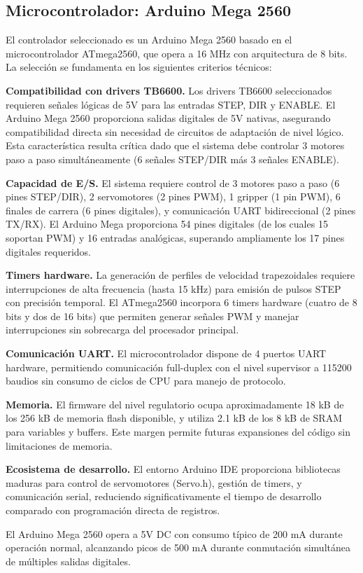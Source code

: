 \subsection{Microcontrolador: Arduino Mega 2560}

El controlador seleccionado es un Arduino Mega 2560 basado en el microcontrolador ATmega2560, que opera a 16 MHz con arquitectura de 8 bits. La selección se fundamenta en los siguientes criterios técnicos:

\textbf{Compatibilidad con drivers TB6600.} Los drivers TB6600 seleccionados requieren señales lógicas de 5V para las entradas STEP, DIR y ENABLE. El Arduino Mega 2560 proporciona salidas digitales de 5V nativas, asegurando compatibilidad directa sin necesidad de circuitos de adaptación de nivel lógico. Esta característica resulta crítica dado que el sistema debe controlar 3 motores paso a paso simultáneamente (6 señales STEP/DIR más 3 señales ENABLE).

\textbf{Capacidad de E/S.} El sistema requiere control de 3 motores paso a paso (6 pines STEP/DIR), 2 servomotores (2 pines PWM), 1 gripper (1 pin PWM), 6 finales de carrera (6 pines digitales), y comunicación UART bidireccional (2 pines TX/RX). El Arduino Mega proporciona 54 pines digitales (de los cuales 15 soportan PWM) y 16 entradas analógicas, superando ampliamente los 17 pines digitales requeridos.

\textbf{Timers hardware.} La generación de perfiles de velocidad trapezoidales requiere interrupciones de alta frecuencia (hasta 15 kHz) para emisión de pulsos STEP con precisión temporal. El ATmega2560 incorpora 6 timers hardware (cuatro de 8 bits y dos de 16 bits) que permiten generar señales PWM y manejar interrupciones sin sobrecarga del procesador principal.

\textbf{Comunicación UART.} El microcontrolador dispone de 4 puertos UART hardware, permitiendo comunicación full-duplex con el nivel supervisor a 115200 baudios sin consumo de ciclos de CPU para manejo de protocolo.

\textbf{Memoria.} El firmware del nivel regulatorio ocupa aproximadamente 18 kB de los 256 kB de memoria flash disponible, y utiliza 2.1 kB de los 8 kB de SRAM para variables y buffers. Este margen permite futuras expansiones del código sin limitaciones de memoria.

\textbf{Ecosistema de desarrollo.} El entorno Arduino IDE proporciona bibliotecas maduras para control de servomotores (Servo.h), gestión de timers, y comunicación serial, reduciendo significativamente el tiempo de desarrollo comparado con programación directa de registros.

El Arduino Mega 2560 opera a 5V DC con consumo típico de 200 mA durante operación normal, alcanzando picos de 500 mA durante conmutación simultánea de múltiples salidas digitales.
